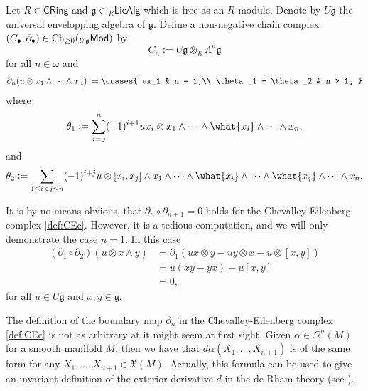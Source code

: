 \begin{definition}
	\label{def:CEc}
	Let $R \in \mathsf{CRing}$ and $\mathfrak{g} \in {_{R}}\mathsf{LieAlg}$ which is free as an $R$-module. Denote by $U\mathfrak{g}$ the universal envelopping algebra of $\mathfrak{g}$. Define a non-negative chain complex $(C_\bullet,\partial_\bullet) \in \operatorname{Ch}_{\geq 0}({_{U\mathfrak{g}}}\mathsf{Mod})$ by
	\begin{equation*}
		C_n := U\mathfrak{g} \otimes_R\Lambda^n \mathfrak{g}
	\end{equation*}
	\noindent for all $n \in \omega$ and
	\begin{align*}
		\partial_n(u \otimes x_1 \wedge \dots \wedge x_n) := \ccases{
			ux_1 & n = 1,\\
			\theta_1 + \theta_2 & n > 1,
		}
	\end{align*}
	\noindent where
	\begin{equation*}
		\theta_1 := \sum_{i = 0}^n (-1)^{i + 1} ux_i \otimes x_1 \wedge \dots \wedge \what{x_i} \wedge \dots \wedge x_n,
	\end{equation*}
	\noindent and
	\begin{equation*}
		\theta_2 := \sum_{1 \leq i < j \leq n} (-1)^{i + j} u \otimes [x_i,x_j] \wedge x_1 \wedge \dots \wedge \what{x_i} \wedge \dots \wedge \what{x_j} \wedge \dots \wedge x_n.
	\end{equation*}
\end{definition}

\begin{remark}
	It is by no means obvious, that $\partial_n \circ \partial_{n + 1} = 0$ holds for the Chevalley-Eilenberg complex \ref{def:CEc}. However, it is a tedious computation, and we will only demonstrate the case $n = 1$. In this case
	\begin{align*}
		(\partial_1 \circ \partial_2)(u \otimes x \wedge y) &= \partial_1(ux \otimes y - uy \otimes x - u \otimes [x,y])\\
		&= u(xy - yx) - u[x,y]\\
		&= 0,
	\end{align*}
	\noindent for all $u \in U\mathfrak{g}$ and $x,y \in \mathfrak{g}$.
\end{remark}

\begin{remark}
	The definition of the boundary map $\partial_n$ in the Chevalley-Eilenberg complex \ref{def:CEc} is not as arbitrary at it might seem at first sight. Given $\alpha \in \Omega^n(M)$ for a smooth manifold $M$, then we have that $d\alpha(X_1,\dots,X_{n + 1})$ is of the same form for any $X_1,\dots,X_{n + 1} \in \mathfrak{X}(M)$. Actually, this formula can be used to give an invariant definition of the exterior derivative $d$ in the de Rham theory (see \cite[370--372]{lee:smooth_manifolds:2013}).
\end{remark}

